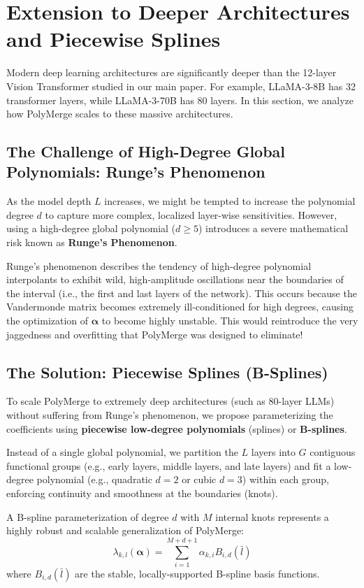 \section{Extension to Deeper Architectures and Piecewise Splines}
\label{sec:appendix_deeper}

Modern deep learning architectures are significantly deeper than the 12-layer Vision Transformer studied in our main paper. For example, LLaMA-3-8B has 32 transformer layers, while LLaMA-3-70B has 80 layers. In this section, we analyze how PolyMerge scales to these massive architectures.

\subsection{The Challenge of High-Degree Global Polynomials: Runge's Phenomenon}
As the model depth $L$ increases, we might be tempted to increase the polynomial degree $d$ to capture more complex, localized layer-wise sensitivities. However, using a high-degree global polynomial ($d \geq 5$) introduces a severe mathematical risk known as \textbf{Runge's Phenomenon}.

Runge's phenomenon describes the tendency of high-degree polynomial interpolants to exhibit wild, high-amplitude oscillations near the boundaries of the interval (i.e., the first and last layers of the network). This occurs because the Vandermonde matrix becomes extremely ill-conditioned for high degrees, causing the optimization of $\boldsymbol{\alpha}$ to become highly unstable. This would reintroduce the very jaggedness and overfitting that PolyMerge was designed to eliminate!

\subsection{The Solution: Piecewise Splines (B-Splines)}
To scale PolyMerge to extremely deep architectures (such as 80-layer LLMs) without suffering from Runge's phenomenon, we propose parameterizing the coefficients using \textbf{piecewise low-degree polynomials} (splines) or \textbf{B-splines}.

Instead of a single global polynomial, we partition the $L$ layers into $G$ contiguous functional groups (e.g., early layers, middle layers, and late layers) and fit a low-degree polynomial (e.g., quadratic $d=2$ or cubic $d=3$) within each group, enforcing continuity and smoothness at the boundaries (knots).

A B-spline parameterization of degree $d$ with $M$ internal knots represents a highly robust and scalable generalization of PolyMerge:
\begin{equation}
\lambda_{k, l}(\boldsymbol{\alpha}) = \sum_{i=1}^{M + d + 1} \alpha_{k, i} B_{i, d}(\bar{l})
\end{equation}
where $B_{i, d}(\bar{l})$ are the stable, locally-supported B-spline basis functions. 

